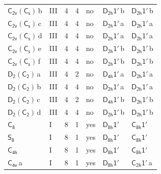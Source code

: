\documentclass[10pt,a4paper]{article}
\numberwithin{equation}{section}
\newcommand{\grp}[1]{\mathsf{#1}}
\newcommand{\clsletter}[1]{\,{\scriptsize\color{black!55}#1}}
\begin{document}
{\begin{longtable}{@{}llrrlll@{}}
\href{C2v-C1v.pdf}{$\grp{C_{2v}}(\grp{C_{s}})$}\clsletter{b} & III & 4 & 4 & no & \href{D2h-1p.pdf}{$\grp{D_{2h}1'}$}\clsletter{b} & \href{D2h-1p.pdf}{$\grp{D_{2h}1'}$}\clsletter{b}\\
\href{C2v-C1v.pdf}{$\grp{C_{2v}}(\grp{C_{s}})$}\clsletter{c} & III & 4 & 4 & no & \href{D2h-1p.pdf}{$\grp{D_{2h}1'}$}\clsletter{a} & \href{D2h-1p.pdf}{$\grp{D_{2h}1'}$}\clsletter{a}\\
\href{C2v-C1v.pdf}{$\grp{C_{2v}}(\grp{C_{s}})$}\clsletter{d} & III & 4 & 4 & no & \href{D2h-1p.pdf}{$\grp{D_{2h}1'}$}\clsletter{a} & \href{D2h-1p.pdf}{$\grp{D_{2h}1'}$}\clsletter{a}\\
\href{C2v-C1v.pdf}{$\grp{C_{2v}}(\grp{C_{s}})$}\clsletter{e} & III & 4 & 4 & no & \href{D2h-1p.pdf}{$\grp{D_{2h}1'}$}\clsletter{b} & \href{D2h-1p.pdf}{$\grp{D_{2h}1'}$}\clsletter{b}\\
\href{C2v-C1v.pdf}{$\grp{C_{2v}}(\grp{C_{s}})$}\clsletter{f} & III & 4 & 4 & no & \href{D2h-1p.pdf}{$\grp{D_{2h}1'}$}\clsletter{b} & \href{D2h-1p.pdf}{$\grp{D_{2h}1'}$}\clsletter{b}\\
\href{D2-C2.pdf}{$\grp{D_{2}}(\grp{C_{2}})$}\clsletter{a} & III & 4 & 2 & no & \href{D4h-1p.pdf}{$\grp{D_{4h}1'}$}\clsletter{a} & \href{D2h-1p.pdf}{$\grp{D_{2h}1'}$}\clsletter{a}\\
\href{D2-C2.pdf}{$\grp{D_{2}}(\grp{C_{2}})$}\clsletter{b} & III & 4 & 4 & no & \href{D2h-1p.pdf}{$\grp{D_{2h}1'}$}\clsletter{a} & \href{D2h-1p.pdf}{$\grp{D_{2h}1'}$}\clsletter{a}\\
\href{D2-C2.pdf}{$\grp{D_{2}}(\grp{C_{2}})$}\clsletter{c} & III & 4 & 2 & no & \href{D4h-1p.pdf}{$\grp{D_{4h}1'}$}\clsletter{b} & \href{D2h-1p.pdf}{$\grp{D_{2h}1'}$}\clsletter{b}\\
\href{D2-C2.pdf}{$\grp{D_{2}}(\grp{C_{2}})$}\clsletter{d} & III & 4 & 4 & no & \href{D2h-1p.pdf}{$\grp{D_{2h}1'}$}\clsletter{b} & \href{D2h-1p.pdf}{$\grp{D_{2h}1'}$}\clsletter{b}\\
\href{../../../rotation/data/pdf/C8.pdf}{$\grp{C_{8}}$} & I & 8 & 1 & yes & \href{D8h-1p.pdf}{$\grp{D_{8h}1'}$} & \href{C8h-1p.pdf}{$\grp{C_{8h}1'}$}\\
\href{../../../rotation/data/pdf/S8.pdf}{$\grp{S_{8}}$} & I & 8 & 1 & yes & \href{D8h-1p.pdf}{$\grp{D_{8h}1'}$} & \href{C8h-1p.pdf}{$\grp{C_{8h}1'}$}\\
\href{../../../rotation/data/pdf/C4h.pdf}{$\grp{C_{4h}}$} & I & 8 & 1 & yes & \href{D8h-1p.pdf}{$\grp{D_{8h}1'}$} & \href{C8h-1p.pdf}{$\grp{C_{8h}1'}$}\\
\href{../../../rotation/data/pdf/C4v.pdf}{$\grp{C_{4v}}$}\clsletter{a} & I & 8 & 1 & yes & \href{D8h-1p.pdf}{$\grp{D_{8h}1'}$} & \href{C2h-1p.pdf}{$\grp{C_{2h}1'}$}\clsletter{a}\\

\end{longtable}}
\end{document}
